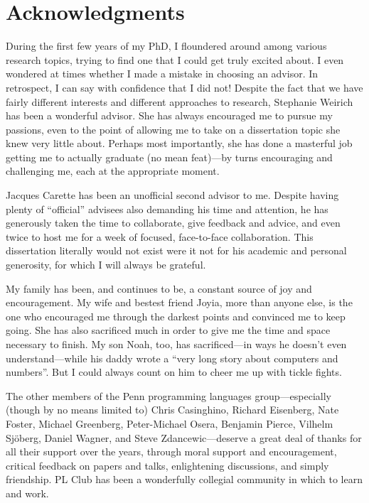 
\newpage
\chapter*{Acknowledgments}

During the first few years of my PhD, I floundered around among
various research topics, trying to find one that I could get truly
excited about. I even wondered at times whether I made a mistake in
choosing an advisor.  In retrospect, I can say with confidence that I
did not! Despite the fact that we have fairly different interests and
different approaches to research, Stephanie Weirich has been a
wonderful advisor.  She has always encouraged me to pursue my
passions, even to the point of allowing me to take on a dissertation
topic she knew very little about.  Perhaps most importantly, she has
done a masterful job getting me to actually graduate (no mean
feat)---by turns encouraging and challenging me, each at the
appropriate moment.

Jacques Carette has been an unofficial second advisor to me.  Despite
having plenty of ``official'' advisees also demanding his time and
attention, he has generously taken the time to collaborate, give
feedback and advice, and even twice to host me for a week of focused,
face-to-face collaboration.  This dissertation literally would not
exist were it not for his academic and personal generosity, for which
I will always be grateful.

My family has been, and continues to be, a constant source of joy and
encouragement.  My wife and bestest friend Joyia, more than anyone
else, is the one who encouraged me through the darkest points and
convinced me to keep going.  She has also sacrificed much in order to
give me the time and space necessary to finish. My son Noah, too, has
sacrificed---in ways he doesn't even understand---while his daddy
wrote a ``very long story about computers and numbers''.  But I could
always count on him to cheer me up with tickle fights.

The other members of the Penn programming languages group---especially
(though by no means limited to) Chris Casinghino, Richard Eisenberg,
Nate Foster, Michael Greenberg, Peter-Michael Osera, Benjamin Pierce,
Vilhelm Sj\"oberg, Daniel Wagner, and Steve Zdancewic---deserve a
great deal of thanks for all their support over the years, through
moral support and encouragement, critical feedback on papers and
talks, enlightening discussions, and simply friendship.  PL Club has
been a wonderfully collegial community in which to learn and work.

